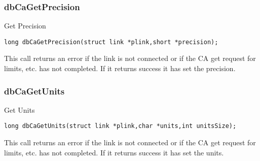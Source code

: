 \subsubsection{dbCaGetPrecision}

Get Precision

\begin{verbatim}long dbCaGetPrecision(struct link *plink,short *precision);
\end{verbatim}This call returns an error if the link is not connected or if the CA get request for limits, etc. has not completed. If it returns 
success it has set the precision.

\subsubsection{dbCaGetUnits}

Get Units

\begin{verbatim}long dbCaGetUnits(struct link *plink,char *units,int unitsSize);
\end{verbatim}This call returns an error if the link is not connected or if the CA get request for limits, etc. has not completed. If it returns 
success it has set the units.
